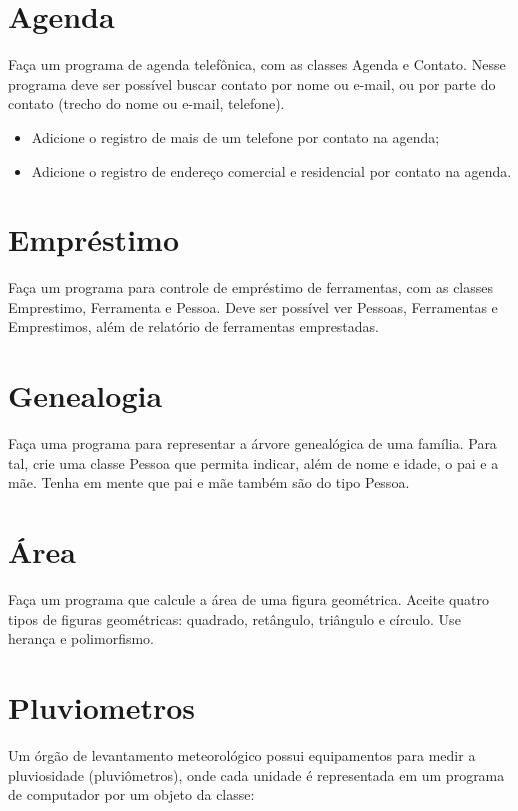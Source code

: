 \documentclass[12pt,a4paper, brazil]{article}
\begin{document}
 \dotfill

\section{Agenda}
\par
Faça um programa de agenda telefônica, com as classes Agenda e Contato. Nesse programa deve ser possível buscar contato por nome ou e-mail, ou por parte do contato (trecho do nome ou e-mail, telefone). 
\begin{itemize}
    \item Adicione o registro de mais de um telefone por contato na agenda;
    \item Adicione o registro de endereço comercial e residencial por contato na agenda.
\end{itemize}

 \dotfill

\section{Empréstimo}
\par
Faça um programa para controle de empréstimo de ferramentas, com as classes Emprestimo, Ferramenta e Pessoa. Deve ser possível ver Pessoas, Ferramentas e Emprestimos, além de relatório de ferramentas emprestadas.

 \dotfill

\section{Genealogia}
\par
Faça uma programa para representar a árvore genealógica de uma família. Para tal, crie uma classe Pessoa que permita indicar, além de nome e idade, o pai e a mãe. Tenha em mente que pai e mãe também são do tipo Pessoa.
 \dotfill

\section{Área}
\par

Faça um programa que calcule a área de uma figura geométrica. Aceite quatro tipos de figuras geométricas: quadrado, retângulo, triângulo e círculo. Use herança e polimorfismo.

 \dotfill

 \section{Pluviometros}
 \par
 Um órgão de levantamento meteorológico possui equipamentos para medir a pluviosidade (pluviômetros), onde cada unidade é representada em um programa de computador por um objeto da classe:
\end{document}
